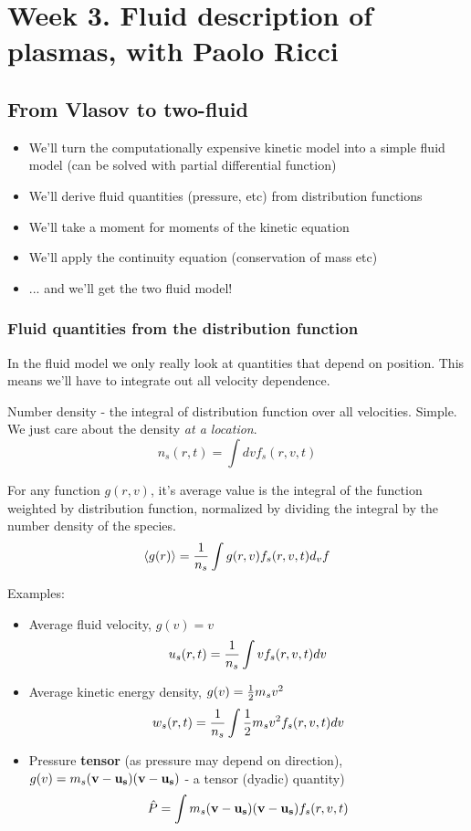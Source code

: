 \documentclass[PlasmaNotes.tex]{subfiles}
\begin{document}
\setcounter{section}{2}
\section{Week 3. Fluid description of plasmas, with Paolo Ricci}
\subsection{From Vlasov to two-fluid}

\begin{itemize}
\item We'll turn the computationally expensive kinetic model into a simple fluid model (can be solved with partial differential function)
\item We'll derive fluid quantities (pressure, etc) from distribution functions
\item We'll take a moment for moments of the kinetic equation
\item We'll apply the continuity equation (conservation of mass etc)
\item ... and we'll get the two fluid model!
\end{itemize}

\subsubsection{Fluid quantities from the distribution function}
In the fluid model we only really look at quantities that depend on position. This means we'll have to integrate out all velocity dependence.

Number density - the integral of distribution function over all velocities. Simple. We just care about the density \emph{at a location}.
\[n_s(r,t) = \int{dv f_s(r, v, t)} \]

For any function $g(r, v)$, it's average value is the integral of the function weighted by distribution function, normalized by dividing the integral by the number density of the species.
\[ \left< g(r) \right> = \frac{1}{n_s} \int{g(r, v) f_s(r,v, t) d_v} f \]

Examples:
\begin{itemize}
\item Average fluid velocity, $g(v) = v$
\[ u_s(r,t) = \frac{1}{n_s} \int{v f_s(r,v,t) dv} \]
\item Average kinetic energy density, $g(v) = \frac{1}{2} m_s v^2$
\[ w_s(r,t) = \frac{1}{n_s} \int{ \frac{1}{2} m_s v^2 f_s(r,v,t) dv} \]
\item Pressure \textbf{tensor} (as pressure may depend on direction), $g(v) = m_s (\mathbf{v} -\mathbf{u_s})(\mathbf{v} -\mathbf{u_s})$ - a tensor (dyadic) quantity)
\[ \hat{P} = \int m_s (\mathbf{v} -\mathbf{u_s}) (\mathbf{v} -\mathbf{u_s}) f_s(r,v,t) \]
\end{itemize}
\end{document}
